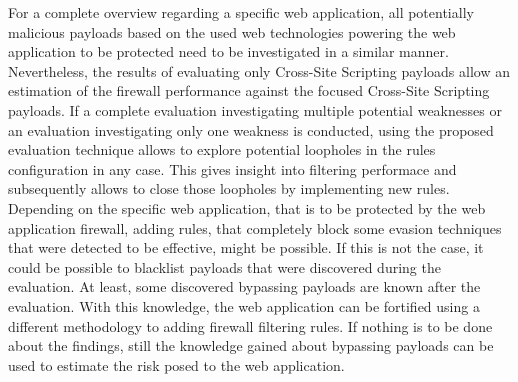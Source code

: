For a complete overview regarding a specific web application, all potentially malicious payloads based on the used web technologies powering the web application to be protected need to be investigated in a similar manner. Nevertheless, the results of evaluating only Cross-Site Scripting payloads allow an estimation of the firewall performance against the focused Cross-Site Scripting payloads. If a complete evaluation investigating multiple potential weaknesses or an evaluation investigating only one weakness is conducted, using the proposed evaluation technique allows to explore potential loopholes in the rules configuration in any case. This gives insight into filtering performace and subsequently allows to close those loopholes by implementing new rules.
Depending on the specific web application, that is to be protected by the web application firewall, adding rules, that completely block some evasion techniques that were detected to be effective, might be possible. If this is not the case, it could be possible to blacklist payloads that were discovered during the evaluation. At least, some discovered bypassing payloads are known after the evaluation. With this knowledge, the web application can be fortified using a different methodology to adding firewall filtering rules. If nothing is to be done about the findings, still the knowledge gained about bypassing payloads can be used to estimate the risk posed to the web application.

